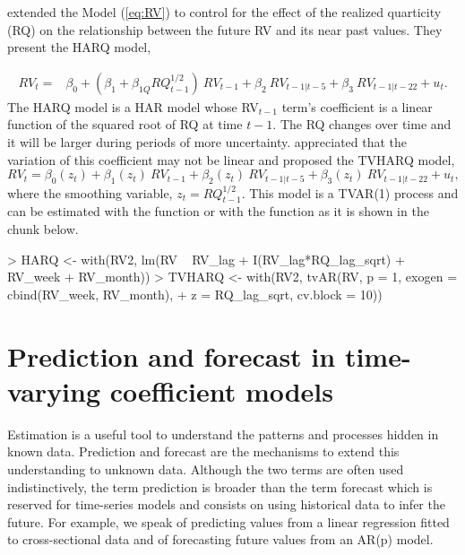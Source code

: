 \citet{Bollerslevetal2016} extended the Model (\ref{eq:RV}) to control for the effect of the realized quarticity (RQ) on the relationship between the future RV and its near past values. They present the HARQ model, 

\begin{align}
RV_t = &\beta_0 + (\beta_1 + \beta_{1Q}RQ^{1/2}_{t-1}) \ RV_{t-1} +\beta_2 \ RV_{t-1|t-5} + \beta_3 \ RV_{t-1|t-22} + u_t.\label{eq:HARQ}
\end{align}
The HARQ model is a HAR model whose RV$_{t-1}$ term's coefficient is a linear function of the squared root of RQ at time $t-1$. The RQ changes over time and it will be larger during periods of more uncertainty. \citet{Casasetal2018} appreciated that the variation of this coefficient may not be linear and proposed the TVHARQ model,
\begin{equation}
RV_t = \beta_0(z_t) + \beta_1(z_t) \ RV_{t-1} + \beta_2(z_t) \ RV_{t-1|t-5} + \beta_3(z_t) \ RV_{t-1|t-22} + u_t,\label{eq:TVHAR}
\end{equation}
where the smoothing variable, $z_t=RQ^{1/2}_{t-1}$. This model is a TVAR(1) process and can be estimated with the function  or with the function  as it is shown in the chunk below. 


\begin{Schunk}
\begin{Sinput}
> HARQ <- with(RV2, lm(RV ~ RV_lag + I(RV_lag*RQ_lag_sqrt) + RV_week + RV_month))
> TVHARQ <- with(RV2, tvAR(RV, p = 1, exogen = cbind(RV_week, RV_month), 
+                          z = RQ_lag_sqrt, cv.block = 10))
\end{Sinput}
\end{Schunk}

\section{Prediction and forecast in time-varying coefficient models}
\label{sec:forecast}

Estimation is a useful tool to understand the patterns and processes hidden in known data. Prediction and forecast are the mechanisms to extend this understanding to unknown data. Although the two terms are often used indistinctively, the term prediction is broader than the term forecast which is reserved for time-series models and consists on using historical data to infer the future. For example, we speak of predicting values from a linear regression fitted to cross-sectional data and of forecasting future values from an AR(p) model.

